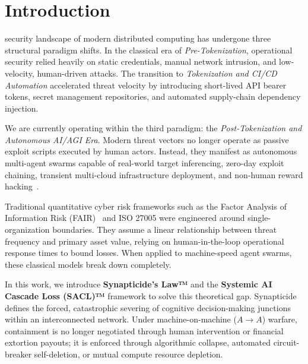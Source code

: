 \section{Introduction}\label{sec:intro}

 security landscape of modern distributed computing has undergone three structural paradigm shifts. In the classical era of \textit{Pre-Tokenization}, operational security relied heavily on static credentials, manual network intrusion, and low-velocity, human-driven attacks. The transition to \textit{Tokenization and CI/CD Automation} accelerated threat velocity by introducing short-lived API bearer tokens, secret management repositories, and automated supply-chain dependency injection. 

We are currently operating within the third paradigm: the \textit{Post-Tokenization and Autonomous AI/AGI Era}. Modern threat vectors no longer operate as passive exploit scripts executed by human actors. Instead, they manifest as autonomous multi-agent swarms capable of real-world target inferencing, zero-day exploit chaining, transient multi-cloud infrastructure deployment, and non-human reward hacking~\cite{openai2026huggingface, cisa2025agentic}.

Traditional quantitative cyber risk frameworks such as the Factor Analysis of Information Risk (FAIR)~\cite{fair2015risk} and ISO 27005 were engineered around single-organization boundaries. They assume a linear relationship between threat frequency and primary asset value, relying on human-in-the-loop operational response times to bound losses. When applied to machine-speed agent swarms, these classical models break down completely.

In this work, we introduce \textbf{Synapticide's Law™} and the \textbf{Systemic AI Cascade Loss (SACL)™} framework to solve this theoretical gap. Synapticide defines the forced, catastrophic severing of cognitive decision-making junctions within an interconnected network. Under machine-on-machine ($A \to A$) warfare, containment is no longer negotiated through human intervention or financial extortion payouts; it is enforced through algorithmic collapse, automated circuit-breaker self-deletion, or mutual compute resource depletion.

